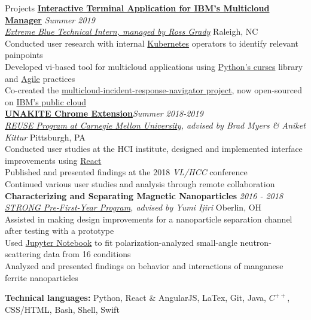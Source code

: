 \documentclass{resume}
\begin{document}
\begin{rSection}{Projects}
\href{https://github.com/IBM/multicloud-incident-response-navigator}{\bf Interactive Terminal Application for IBM's Multicloud Manager} \hfill  {\em Summer 2019} \\
\href{https://www.ibm.com/employment/extremeblue/index.html}{\em Extreme Blue Technical Intern, managed by Ross Grady} \hfill { Raleigh, NC} \\
{Conducted user research with internal \underline{Kubernetes} operators to identify relevant painpoints} \\
Developed vi-based tool for multicloud applications using \underline{Python's curses} library and \underline{Agile} practices \\
{Co-created the \href{https://github.com/IBM/multicloud-incident-response-navigator}{multicloud-incident-response-navigator project}, now open-sourced on \href{https://github.com/IBM/multicloud-incident-response-navigator}{IBM's public cloud}} \\
{\bf \href{https://unakite.info/}{UNAKITE Chrome Extension}}\hfill {\em Summer 2018-2019} \\
{\em \href{https://www.cmu.edu/scs/isr/reuse/}{REUSE Program at Carnegie Mellon University}, advised by Brad Myers \& Aniket Kittur} \hfill { Pittsburgh, PA}\\
Conducted user studies at the HCI institute, designed and implemented interface improvements using \underline{React} \\
Published and presented findings at the 2018 {\em VL/HCC} conference \\
Continued various user studies and analysis through remote collaboration\\
{\bf Characterizing and Separating Magnetic Nanoparticles } \hfill {\em 2016 - 2018}\\
{\em \href{https://www.oberlin.edu/undergraduate-research/programs/strong}{STRONG Pre-First-Year Program}, advised by Yumi Ijiri } \hfill { Oberlin, OH}\\
Assisted in making design improvements for a nanoparticle separation channel after testing with a prototype \\
Used \underline{Jupyter Notebook} to fit polarization-analyzed small-angle neutron-scattering data from 16 conditions \\
Analyzed and presented findings on behavior and interactions of manganese ferrite nanoparticles  

 \textbf{Technical languages:} {Python, React \& AngularJS, LaTex, Git, Java, {$C^{++}$}, CSS/HTML, Bash, Shell, Swift}
\end{rSection}
\end{document}
